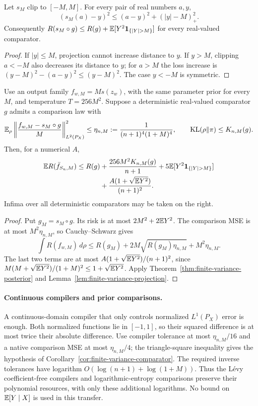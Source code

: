 \begin{lemma}
\label{lem:finite-variance-projection}
Let $s_M$ clip to $[-M,M]$. For every pair of real numbers $a,y$,
\begin{equation}
 (s_M(a)-y)^2\le(a-y)^2+(|y|-M)_+^2.
 \label{eq:pointwise-projection-transfer}
\end{equation}
Consequently $R(s_M\circ g)\le R(g)+
\E[Y^2\mathbf1_{\{|Y|>M\}}]$ for every real-valued comparator.
\end{lemma}
\begin{proof}
If $|y|\le M$, projection cannot increase distance to $y$.
If $y>M$, clipping $a<-M$ also decreases its distance to $y$;
for $a>M$ the loss increase is
$(y-M)^2-(a-y)^2\le(y-M)^2$.
The case $y<-M$ is symmetric.
\end{proof}

\begin{corollary}
\label{cor:finite-variance-comparator}
Use an output family $f_{w,M}=M s(z_w)$, with the same parameter
prior for every $M$, and temperature $T=256M^2$.
Suppose a deterministic real-valued comparator $g$ admits a
comparison law with
\[
 \mathbb E_\rho\left\|\frac{f_{w,M}-s_M\circ g}{M}\right\|_{L^2(P_X)}^2
 \le\eta_{n,M}:=\frac1{(n+1)^4(1+M)^4},
 \qquad \operatorname{KL}(\rho\|\pi)\le K_{n,M}(g).
\]
Then, for a numerical $A$,
\begin{align}
 \E R(\bar f_{S_n,M})\le R(g)
 &+\frac{256M^2 K_{n,M}(g)}{n+1}
 +5\E[Y^2\mathbf1_{\{|Y|>M\}}]\notag\\
 &+\frac{A(1+\sqrt{\E Y^2})}{(n+1)^2}.
 \label{eq:finite-variance-real-oracle}
\end{align}
Infima over all deterministic comparators may be taken on the right.
\end{corollary}
\begin{proof}
Put $g_M=s_M\circ g$. Its risk is at most
$2M^2+2\mathbb E Y^2$. The comparison MSE is at most $M^2\eta_{n,M}$,
so Cauchy--Schwarz gives
\[
 \int R(f_{w,M})\,d\rho
 \le R(g_M)+2M\sqrt{R(g_M)\eta_{n,M}}+M^2\eta_{n,M}.
\]
The last two terms are at most
$A(1+\sqrt{\mathbb E Y^2})/(n+1)^2$, since
$M(M+\sqrt{\mathbb E Y^2})/(1+M)^2\le1+\sqrt{\mathbb E Y^2}$.
Apply Theorem~\ref{thm:finite-variance-posterior} and
Lemma~\ref{lem:finite-variance-projection}.
\end{proof}

\paragraph{Continuous compilers and prior comparisons.}
A continuous-domain compiler that only controls normalized
$L^1(P_X)$ error is enough. Both normalized functions lie in $[-1,1]$,
so their squared difference is at most twice their absolute difference.
Use compiler tolerance at most $\eta_{n,M}/16$ and a native comparison
MSE at most $\eta_{n,M}/4$; the triangle-square inequality gives the
hypothesis of Corollary~\ref{cor:finite-variance-comparator}.
The required inverse tolerances have logarithm
$O(\log(n+1)+\log(1+M))$. Thus the L\'evy coefficient-free compilers
and logarithmic-entropy comparisons preserve their polynomial
resources, with only these additional logarithms. No bound on
$\mathbb E[Y\mid X]$ is used in this transfer.

